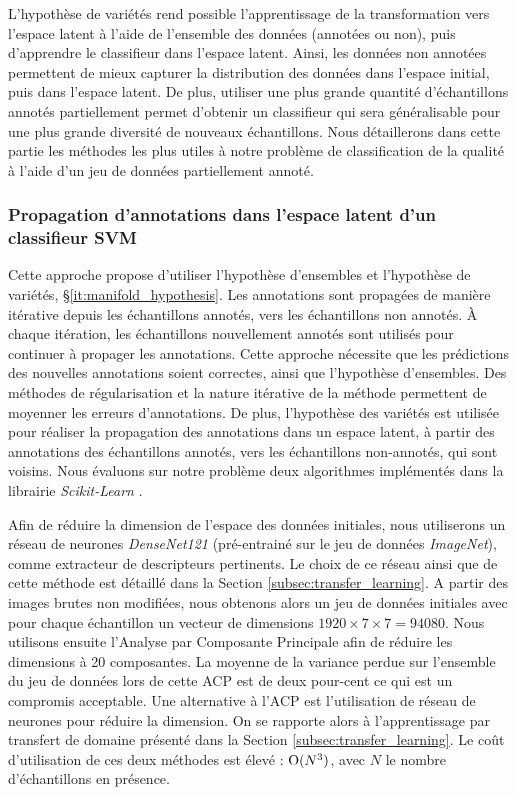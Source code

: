 L'hypothèse de variétés rend possible l'apprentissage de la transformation vers l'espace latent à l'aide de l'ensemble des données (annotées ou non), puis d'apprendre le classifieur dans l'espace latent.
Ainsi, les données non annotées permettent de mieux capturer la distribution des données dans l'espace initial, puis dans l'espace latent.
De plus, utiliser une plus grande quantité d'échantillons annotés partiellement permet d'obtenir un classifieur qui sera généralisable pour une plus grande diversité de nouveaux échantillons.
Nous détaillerons dans cette partie les méthodes les plus utiles à notre problème de classification de la qualité à l'aide d'un jeu de données partiellement annoté.

\subsubsection{Propagation d'annotations dans l'espace latent d'un classifieur SVM} \label{subsubsec:propagation}
Cette approche propose d'utiliser l'hypothèse d'ensembles et l'hypothèse de variétés, §\ref{it:manifold_hypothesis}.
Les annotations sont propagées de manière itérative depuis les échantillons annotés, vers les échantillons non annotés.
À chaque itération, les échantillons nouvellement annotés sont utilisés pour continuer à propager les annotations.
Cette approche nécessite que les prédictions des nouvelles annotations soient correctes, ainsi que l'hypothèse d'ensembles.
Des méthodes de régularisation et la nature itérative de la méthode permettent de moyenner les erreurs d'annotations.
De plus, l'hypothèse des variétés est utilisée pour réaliser la propagation des annotations dans un espace latent, à partir des annotations des échantillons annotés, vers les échantillons non-annotés, qui sont voisins.
Nous évaluons sur notre problème deux algorithmes implémentés dans la librairie \textit{Scikit-Learn} \cite{pedregosa_scikit-learn_2011}.

Afin de réduire la dimension de l'espace des données initiales, nous utiliserons un réseau de neurones \textit{DenseNet121} \cite{huang_densely_2016} (pré-entrainé sur le jeu de données \textit{ImageNet}), comme extracteur de descripteurs pertinents.
Le choix de ce réseau ainsi que de cette méthode est détaillé dans la Section \ref{subsec:transfer_learning}.
A partir des images brutes non modifiées, nous obtenons alors un jeu de données initiales avec pour chaque échantillon un vecteur de dimensions $1920 \times 7 \times 7 = 94 080$.
Nous utilisons ensuite l'Analyse par Composante Principale \cite{jolliffe_principal_2002} afin de réduire les dimensions à 20 composantes. La moyenne de la variance perdue sur l'ensemble du jeu de données lors de cette ACP est de deux pour-cent ce qui est un compromis acceptable.
Une alternative à l'ACP est l'utilisation de réseau de neurones pour réduire la dimension.
On se rapporte alors à l'apprentissage par transfert de domaine présenté dans la Section \ref{subsec:transfer_learning}.
Le coût d'utilisation de ces deux méthodes est élevé : $\operatorname{O}(N^3)$, avec $N$ le nombre d'échantillons en présence.

